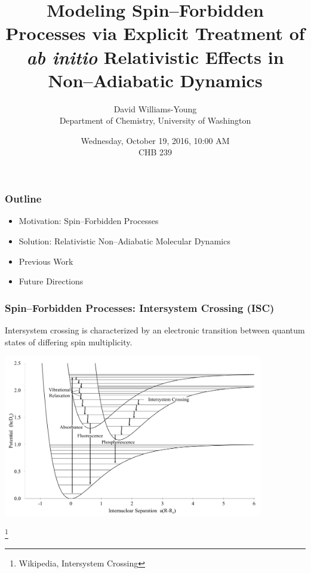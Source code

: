 \documentclass[usepdftitle=false,10pt]{beamer}
\title{Modeling Spin--Forbidden Processes via Explicit Treatment of \emph{ab initio} Relativistic Effects in Non--Adiabatic Dynamics}
\date{Wednesday, October 19, 2016, 10:00 AM \\ CHB 239}
\author{David Williams-Young\\ Department of Chemistry, University of Washington\\
}
\newcommand\blfootnote[1]{%
  \begingroup
  \renewcommand\thefootnote{}\footnote{#1}%
  \addtocounter{footnote}{-1}%
  \endgroup
}
\begin{document}
\begin{frame}
  \titlepage
\end{frame}

\begin{frame}
  \frametitle{Outline}
  \begin{itemize}
    \item[\ding{228}] Motivation: Spin--Forbidden Processes
    \item[\ding{228}] Solution: Relativistic Non--Adiabatic Molecular Dynamics
    \item[\ding{228}] Previous Work
    \item[\ding{228}] Future Directions
  \end{itemize}
\end{frame}

\begin{frame}
  \frametitle{Spin--Forbidden Processes: Intersystem Crossing (ISC)}

  \noindent
  Intersystem crossing is characterized by an electronic transition between
  quantum states of differing spin multiplicity.

  \begin{center}
  \includegraphics[width=0.85\textwidth]{ISC} 
  \end{center}
  \vspace{-1cm}
  \blfootnote{\tiny Wikipedia, Intersystem Crossing}
\end{frame}

\end{document}
